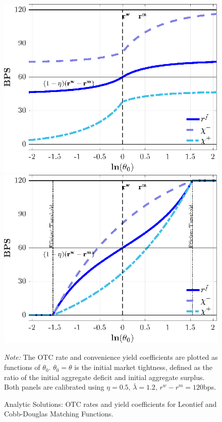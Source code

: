 \documentclass[12pt,american,english,notitlepage]{article}
\begin{document}
\begin{figure}[H]

    \begin{minipage}[b]{.49\linewidth} 
    \includegraphics[width=1\linewidth]{NewCode/Figures/F_l_prices_theta.eps}
\end{minipage}\hfill{}    \begin{minipage}[b]{.49\linewidth}
\includegraphics[width=1\linewidth]{NewCode/Figures/F_cd_prices_theta.eps}
\end{minipage}
\centering{}\caption{\label{fig:closed.formfigures}  Analytic Solutions:  OTC rates
and yield coefficients for Leontief and Cobb-Douglas Matching Functions.}
\parbox[t]{\textwidth}{\footnotesize
\textit{Note:} The OTC rate and convenience yield coefficients are plotted as
functions of $\theta_{0}$. $\theta_{0}=\theta$ is the initial market tightness, defined as the ratio of the initial aggregate deficit and
initial aggregate surplus. Both panels are calibrated using $\eta=0.5$, $\bar{\lambda}=1.2$,
$r^{w}-r^{m}=120$bps. }
\end{figure}
\end{document}
